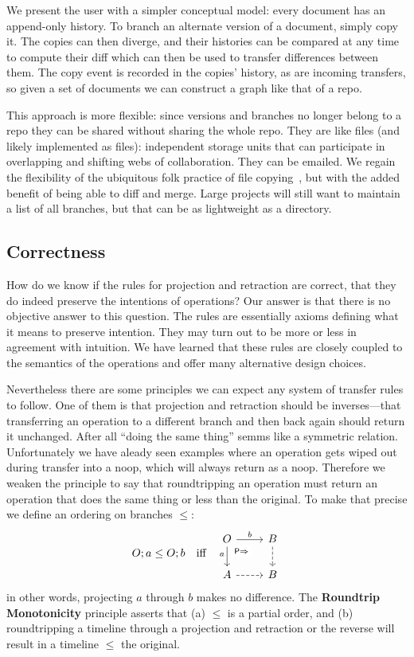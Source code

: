 \documentclass[english,submission]{programming}
\theoremstyle{definition}
\newcommand{\mathbox}[1]{\colorbox{black!10}{$#1$}}
\begin{document}
We present the user with a simpler conceptual model: every document has an append-only history. To branch an alternate version of a document, simply copy it. The copies can then diverge, and their histories can be compared at any time to compute their diff which can then be used to transfer differences between them. The copy event is recorded in the copies' history, as are incoming transfers, so given a set of documents we can construct a graph like that of a repo.

This approach is more flexible: since versions and branches no longer belong to a repo they can be shared without sharing the whole repo. They are like files (and likely implemented as files): independent storage units that can participate in overlapping and shifting webs of collaboration. They can be emailed. We regain the flexibility of the ubiquitous folk practice of file copying~\cite{Burnett14, Basman19}, but with the added benefit of being able to diff and merge. Large projects will still want to maintain a list of all branches, but that can be as lightweight as a directory.


\subsection{Correctness}

How do we know if the rules for projection and retraction are correct, that they do indeed preserve the intentions of operations? Our answer is that there is no objective answer to this question. The rules are essentially axioms defining what it means to preserve intention. They may turn out to be more or less in agreement with intuition. We have learned that these rules are closely coupled to the semantics of the operations and offer many alternative design choices.

Nevertheless there are some principles we can expect any system of transfer rules to follow. One of them is that projection and retraction should be inverses---that transferring an operation to a different branch and then back again should return it unchanged. After all ``doing the same thing'' semms like a symmetric relation. Unfortunately we have aleady seen examples where an operation gets wiped out during transfer into a \textsf{noop}, which will always return as a \textsf{noop}. Therefore we weaken the principle to say that roundtripping an operation must return an operation that does the same thing or less than the original. To make that precise we define an ordering on branches \mathbox{\leq}:
\[
O; a \leq O; b \quad\textrm{iff} \quad
\begin{tikzcd}
	O & B \\
	A & B
	\arrow["{b}", from=1-1, to=1-2]
	\arrow["{a}"'{pos=0.4}, from=1-1, to=2-1]
	\arrow["{\textsf{P}\Rightarrow}"{description, pos=0.2}, draw=none, from=1-1, to=2-2]
	\arrow[dashed, from=1-2, to=2-2]
	\arrow[dashed, from=2-1, to=2-2]
\end{tikzcd}
\]
in other words, projecting $a$ through $b$ makes no difference. The \textbf{Roundtrip Monotonicity} principle asserts that (a) \mathbox{\leq} is a partial order, and (b) roundtripping a timeline through a projection and retraction or the reverse will result in a timeline $\leq$ the original.
\end{document}
